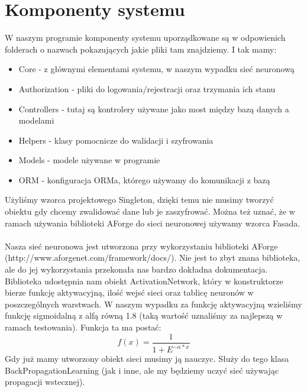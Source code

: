 \documentclass[12pt,a4paper]{article}
\begin{document}
\section*{Komponenty systemu}
W naszym programie komponenty systemu uporządkowane są w odpowienich folderach o nazwach pokazujących jakie pliki tam znajdziemy. I tak mamy:\\
\begin{itemize}
\item Core - z głównymi elementami systemu, w naszym wypadku sieć neuronową\\
\item Authorization - pliki do logowania/rejestracji oraz trzymania ich stanu\\
\item Controllers - tutaj są kontrolery używane jako most między bazą danych a modelami\\
\item Helpers - klasy pomocnicze do walidacji i szyfrowania\\
\item Models - modele używane w programie\\
\item ORM - konfiguracja ORMa, którego używamy do komunikacji z bazą\\
\end{itemize}

Użyliśmy wzorca projektowego Singleton, dzięki temu nie musimy tworzyć obiektu gdy chcemy zwalidować dane lub je zaszyfrować. Można też uznać, że w ramach używania biblioteki AForge do sieci neuronowej używamy wzorca Fasada.\\\\

Nasza sieć neuronowa jest utworzona przy wykorzystaniu biblioteki AForge \\(http://www.aforgenet.com/framework/docs/). Nie jest to zbyt znana biblioteka, ale do jej wykorzystania przekonała nas bardzo dokładna dokumentacja.\\
Biblioteka udostępnia nam obiekt ActivationNetwork, który w konstruktorze bierze funkcję aktywacyjną, ilość wejsć sieci oraz tablicę neuronów w poszczególnych warstwach. W naszym wypadku za funkcję aktywacyjną wzieliśmy funkcję sigmoidalną z alfą równą 1.8 (taką wartość uznaliśmy za najlepszą w ramach testowania). Funkcja ta ma postać:
\begin{equation}
f(x)=\dfrac{1}{1+E^{-\alpha *x}}
\end{equation}
 Gdy już mamy utworzony obiekt sieci musimy ją nauczyc. Służy do tego klasa BackPropagationLearning (jak i inne, ale my będziemy uczyć sieć używając propagacji wstecznej).
	
\end{document}
